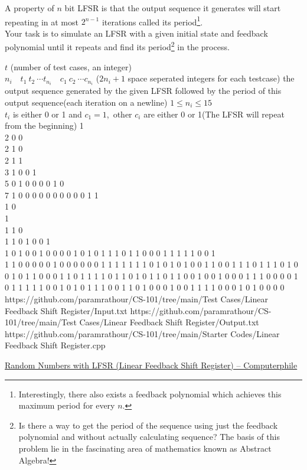 A property of $n$ bit LFSR is that the output sequence it generates will start repeating in at most $2^{n-1}$ iterations called its period\footnote{Interestingly, there also exists a feedback polynomial which achieves this maximum period for every $n$.}.\\
Your task is to simulate an LFSR with a given initial state and feedback polynomial until it repeats and find its period\footnote{Is there a way to get the period of the sequence using just the feedback polynomial and without actually calculating sequence? The basis of this problem lie in the fascinating area of mathematics known as Abstract Algebra!
} in the process.
\begin{testcasesMore}
	{$t$ \hfill(number of test cases, an integer)\\
	$n_i\quad t_1\ t_2\ \cdots t_{n_i}\quad c_1\ c_2\ \cdots c_{n_i}$ \hfill($2n_i+1$ space seperated integers for each testcase)}
	{the output sequence generated by the given LFSR followed by the period of this output sequence\hfill(each iteration on a newline)}
	{$1 \leq n_i \leq 15$\\
	$t_i$ is either 0 or 1 and $c_1 = 1$\footnotemark,\ other $c_i$ are either 0 or 1\hfill(The LFSR will repeat from the beginning)}
	{1 \\2 0 0\\2  1  0\\2  1  1\\3  1 0  0 1\\5  0 1 0 0  0 0 1 0\\7  1 0 0 0 0 0  0 0 0 0 0 1}
	{1\\1 0\\1\\1 1 0\\1 1 0 1 0 0 1\\1 0 1 0 0 1 0 0 0 0 1 0 1 0 1 1 1 0 1 1 0 0 0 1 1 1 1 1 0 0 1\\1 1 0 0 0 0 0 1 0 0 0 0 0 0 1 1 1 1 1 1 1 0 1 0 1 0 1 0 0 1 1 0 0 1 1 1 0 1 1 1 0 1 0 0 1 0 1 1 0 0 0 1 1 0 1 1 1 1 0 1 1 0 1 0 1 1 0 1 1 0 0 1 0 0 1 0 0 0 1 1 1 0 0 0 0 1 0 1 1 1 1 1 0 0 1 0 1 0 1 1 1 0 0 1 1 0 1 0 0 0 1 0 0 1 1 1 1 0 0 0 1 0 1 0 0 0 0}
	{https://github.com/paramrathour/CS-101/tree/main/Test Cases/Linear Feedback Shift Register/Input.txt}
	{https://github.com/paramrathour/CS-101/tree/main/Test Cases/Linear Feedback Shift Register/Output.txt}
	{https://github.com/paramrathour/CS-101/tree/main/Starter Codes/Linear Feedback Shift Register.cpp}
\end{testcasesMore}
\begin{funvideo}
	\href{https://youtu.be/Ks1pw1X22y4}{Random Numbers with LFSR (Linear Feedback Shift Register) -- Computerphile}
\end{funvideo}
\recalctypearea